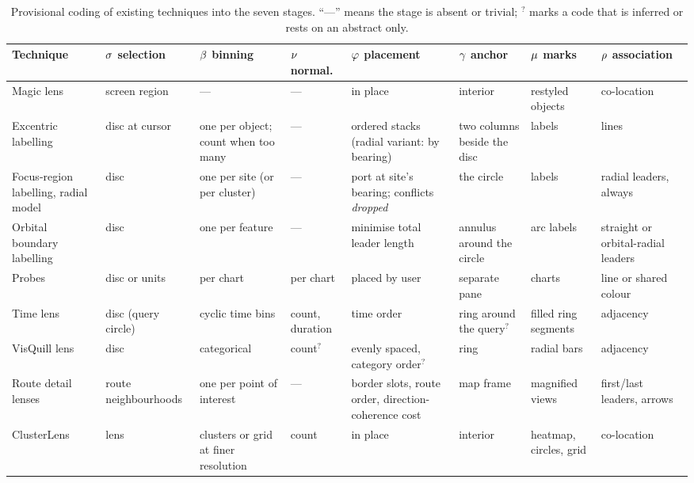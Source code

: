 \begin{table}[t]
  \centering
  \scriptsize
  \setlength{\tabcolsep}{3pt}
  \renewcommand{\arraystretch}{1.12}
  \caption{Provisional coding of existing techniques into the seven stages.
  ``---'' means the stage is absent or trivial; $^{?}$ marks a code that is
  inferred or rests on an abstract only.}
  \label{tab:coding}
  \begin{tabularx}{\textwidth}{@{}>{\raggedright}p{2.55cm}
      >{\raggedright}X >{\raggedright}X >{\raggedright}p{1.35cm}
      >{\raggedright}X >{\raggedright}X >{\raggedright}X >{\raggedright\arraybackslash}X@{}}
    \toprule
    Technique & $\sigma$ selection & $\beta$ binning & $\nu$ normal. & $\varphi$ placement & $\gamma$ anchor & $\mu$ marks & $\rho$ association \\
    \midrule
    Magic lens \cite{bier1993toolglass} & screen region & --- & --- & in place & interior & restyled objects & co-location \\
    Excentric labelling \cite{fekete1999excentric} & disc at cursor & one per object; count when too many & --- & ordered stacks (radial variant: by bearing) & two columns beside the disc & labels & lines \\
    Focus-region labelling, radial model \cite{fink2012focus} & disc & one per site (or per cluster) & --- & port at site's bearing; conflicts \emph{dropped} & the circle & labels & radial leaders, always \\
    Orbital boundary labelling \cite{bonerath2024orbital} & disc & one per feature & --- & minimise total leader length & annulus around the circle & arc labels & straight or orbital-radial leaders \\
    Probes \cite{butkiewicz2008probes} & disc or units & per chart & per chart & placed by user & separate pane & charts & line or shared colour \\
    Time lens \cite{tominski2012stacking} & disc (query circle) & cyclic time bins & count, duration & time order & ring around the query$^{?}$ & filled ring segments & adjacency \\
    VisQuill lens \cite{visquill} & disc & categorical & count$^{?}$ & evenly spaced, category order$^{?}$ & ring & radial bars & adjacency \\
    Route detail lenses \cite{karnick2010route} & route neighbourhoods & one per point of interest & --- & border slots, route order, direction-coherence cost & map frame & magnified views & first/last leaders, arrows \\
    ClusterLens \cite{zhang2020clusterlens} & lens & clusters or grid at finer resolution & count & in place & interior & heatmap, circles, grid & co-location \\

\end{tabularx}
\end{table}
